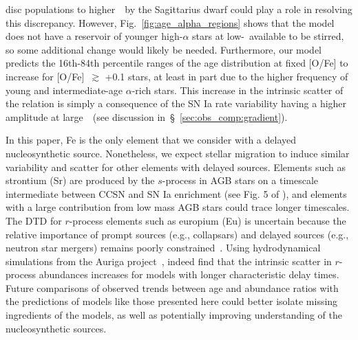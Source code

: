 \documentclass[draft2.tex]{subfiles}
\begin{document}
disc populations to higher~\absz~by the Sagittarius dwarf could play a role in 
resolving this discrepancy. 
However, Fig.~\ref{fig:age_alpha_regions} shows that the model does not have a 
reservoir of younger high-$\alpha$ stars at low-\absz~available to be stirred, 
so some additional change would likely be needed. 
Furthermore, our model predicts the 16th-84th percentile ranges of the age 
distribution at fixed [O/Fe] to increase for [O/Fe]~$\gtrsim$ +0.1 stars, at 
least in part due to the higher frequency of young and intermediate-age 
$\alpha$-rich stars. 
This increase in the intrinsic scatter of the relation is simply a consequence 
of the SN Ia rate variability having a higher amplitude at large~\rgal~(see 
discussion in~\S~\ref{sec:obs_comp:gradient}). 
\par 
In this paper, Fe is the only element that we consider with a delayed 
nucleosynthetic source. 
Nonetheless, we expect stellar migration to induce similar variability and 
scatter for other elements with delayed sources. 
Elements such as strontium (Sr) are produced by the $s$-process in AGB stars on 
a timescale intermediate between CCSN and SN Ia enrichment (see Fig. 5 of 
\citealp{Johnson2020}), and elements with a large contribution from low mass 
AGB stars could trace longer timescales. 
The DTD for $r$-process elements such as europium (Eu) is uncertain because the 
relative importance of prompt sources (e.g., collapsars) and delayed sources 
(e.g., neutron star mergers) remains poorly constrained~\citep{Cote2019, 
Mishenina2019, Siegel2019, Vincenzo2021b}. 
Using hydrodynamical simulations from the Auriga project~\citep{Grand2017}, 
\citet{vandeVoort2020} indeed find that the intrinsic scatter in $r$-process 
abundances increases for models with longer characteristic delay times. 
Future comparisons of observed trends between age and abundance ratios with the 
predictions of models like those presented here could better isolate missing 
ingredients of the models, as well as potentially improving understanding of 
the nucleosynthetic sources. 
\end{document}

